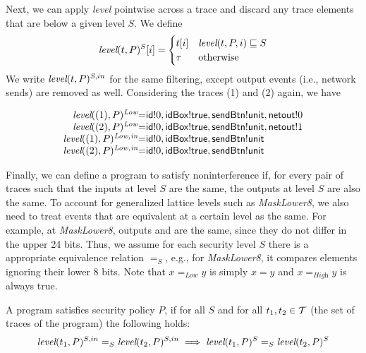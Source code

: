 Next, we can apply \textit{level} pointwise across a trace and discard
any trace elements that are below a given level $S$. We define
\begin{displaymath}
  \textit{level}(t, P)^S[i] =
  \begin{cases}
    t[i] & \textit{level}(t, P, i) \sqsubseteq S \\
    \tau & \textrm{otherwise}
  \end{cases}
\end{displaymath}
We write $\textit{level}(t, P)^{S,in}$ for the same filtering, except
output events (i.e., network sends) are removed as well.
%
Considering the traces (1) and (2) again, we have

\begin{displaymath}
  \begin{array}{r@{ }c@{ }l}
    \tleveltr{(1)}{P}^\textit{Low} & = & \code{id}!0, \code{idBox}!\code{true},
    \code{sendBtn}!\code{unit}, \code{netout}!0 \\
    \tleveltr{(2)}{P}^\textit{Low} & = & \code{id}!0, \code{idBox}!\code{true},
    \code{sendBtn}!\code{unit}, \code{netout}!1 \\
    \tleveltr{(1)}{P}^\textit{Low,in} & = & \code{id}!0, \code{idBox}!\code{true},
    \code{sendBtn}!\code{unit} \\
    \tleveltr{(2)}{P}^\textit{Low,in} & = & \code{id}!0, \code{idBox}!\code{true},
    \code{sendBtn}!\code{unit} \\
  \end{array}
\end{displaymath}

Finally, we can define a program to satisfy noninterference if, for
every pair of traces such that the inputs at level $S$ are the same,
the outputs at level $S$ are also the same.
%
To account for generalized lattice levels such as \textit{MaskLower8},
we also need to treat events that are equivalent at a certain level as
the same. For example, at \textit{MaskLower8}, outputs
 and  are the same, since they do
not differ in the upper 24 bits. Thus, we assume for each security
level $S$ there is a appropriate equivalence relation $=_S$, e.g., for
\textit{MaskLower8}, it compares elements ignoring their lower 8
bits. Note that $x =_\textit{Low} y$ is simply $x = y$ and
$x =_\textit{High} y$ is always true.

\begin{definition}
  \label{defn:noninterference}
  A program satisfies security policy $P$, if for all $S$ and for
  all $t_1, t_2 \in
  \mathcal{T}$ (the set of traces of the program) the following holds:
  \begin{displaymath}
    \textit{level}(t_1, P)^{S,in} =_S \textit{level}(t_2, P)^{S,in}
    \implies
    \textit{level}(t_1, P)^S =_S \textit{level}(t_2, P)^S \\
  \end{displaymath}
\end{definition}

